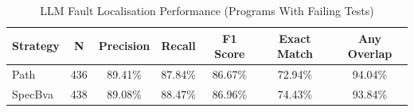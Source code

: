 \begin{table}[htbp]
\centering
\caption{LLM Fault Localisation Performance (Programs With Failing Tests)}
\label{tab:llm_metrics_failing}
\begin{tabular}{l c c c c c c}
\hline
\textbf{Strategy} & \textbf{N} & \textbf{Precision} & \textbf{Recall} & \textbf{F1 Score} & \textbf{Exact Match} & \textbf{Any Overlap} \\
\hline
Path & 436 & 89.41\% & 87.84\% & 86.67\% & 72.94\% & 94.04\% \\
SpecBva & 438 & 89.08\% & 88.47\% & 86.96\% & 74.43\% & 93.84\% \\
\hline
\end{tabular}
\end{table}
